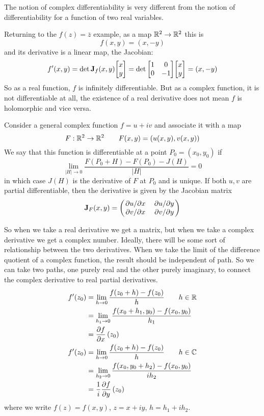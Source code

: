 The notion of complex differentiability is very different from the notion of differentiability for a function of two real variables. 

\begin{example}
	Returning to the $f(z) = \bar z$ example, as a map $\mathbb{R}^2 \to \mathbb{R}^2$ this is
	\[ f(x, y) = (x, -y) \]
	and its derivative is a linear map, the Jacobian:
	\[ f'(x, y) = \det \mathbf J_f(x,y) \mqty[x \\ y] = \det \mqty[1 & 0 \\ 0 & -1] \mqty[x \\ y] = (x, -y) \]
	So as a real function, $f$ is infinitely differentiable. But as a complex function, it is not differentiable at all, the existence of a real derivative does not mean $f$ is holomorphic and vice versa.
\end{example}

Consider a general complex function $f = u + iv$ and associate it with a map
\[ F: \mathbb{R}^2 \to \mathbb{R}^2 \qquad F(x, y) = (u(x,y), v(x,y)) \]
We say that this function is differentiable at a point $P_0 = (x_0, y_0)$ if
\[ \lim_{|H| \to 0} \frac{F(P_0 + H) - F(P_0) - J(H)}{|H|} = 0 \]
in which case $J(H)$ is the derivative of $F$ at $P_0$ and is unique. If both $u, v$ are partial differentiable, then the derivative is given by the Jacobian matrix
\[ \mathbf J_F(x, y) = \mqty(\pdv*{u}{x} & \pdv*{u}{y} \\ \pdv*{v}{x} & \pdv*{v}{y}) \]

So when we take a real derivative we get a matrix, but when we take a complex derivative we get a complex number. Ideally, there will be some sort of relationship between the two derivatives. When we take the limit of the difference quotient of a complex function, the result should be independent of path. So we can take two paths, one purely real and the other purely imaginary, to connect the complex derivative to real partial derivatives.
\begin{align*}
	f'(z_0) &= \lim_{h \to 0} \frac{f(z_0 + h) - f(z_0)}{h} \qquad h \in \mathbb{R} \\
	&= \lim_{h_1 \to 0} \frac{f(x_0 + h_1, y_0) - f(x_0, y_0)}{h_1} \\
	&= \pdv{f}{x}\,(z_0) \\
	f'(z_0) &= \lim_{h \to 0} \frac{f(z_0 + h) - f(z_0)}{h} \qquad h \in \mathbb{C} \\
	&= \lim_{h_2 \to 0} \frac{f(x_0, y_0 + h_2) - f(x_0, y_0)}{ih_2} \\
	&= \frac{1}{i} \pdv{f}{y} \,(z_0) 
\end{align*}
where we write $f(z) = f(x, y)$, $z = x + iy$, $h = h_1 + i h_2$.

